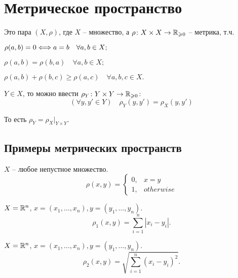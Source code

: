 \date{4 декабря 2024}

\section{Метрическое пространство}
\begin{definition}
    Это пара $(X, \rho)$, где $X$ -- множество, а $\rho\colon X\times X\to \mathbb R_{\geqslant 0}$ -- метрика, т.ч. \begin{conditions}
        \item $\rho(a,b) = 0 \Longleftrightarrow a = b \quad \forall a,b \in X;$ 
        \item $\rho(a,b) = \rho(b,a) \quad \forall a,b \in X;$
        \item $\rho(a, b) + \rho(b,c) \geqslant \rho(a,c) \quad \forall a,b,c \in X.$\footnotemark
    \end{conditions}
\end{definition}
\begin{definition}
    $Y \in X$, то можно ввести $\rho_Y\colon Y\times Y \to \mathbb R_{\geqslant0}$: \[
    (\forall y, y' \in Y)\quad \rho_Y(y, y') = \rho_X(y, y')
    \]

    То есть $\rho_Y = \rho_X|_{Y\times Y}$.
\end{definition}
\subsection*{Примеры метрических пространств}
\begin{example}
    $X$ -- любое непустное множество. \begin{equation}
        \rho(x,y) = \begin{cases}
            0, & x=y \\
            1, &otherwise
        \end{cases}
    \end{equation}
\end{example}
\begin{example}
    $X = \mathbb R^n$, $x = (x_1, \ldots, x_n), y =(y_1, \ldots, y_n)$. \begin{equation}
        \rho_1(x,y) = \sum_{i=1}^n |x_i-y_i|.
    \end{equation}
\end{example}
\begin{example}
    $X = \mathbb R^n$, $x = (x_1, \ldots, x_n), y =(y_1, \ldots, y_n)$. \begin{equation}
        \rho_2(x,y) = \sqrt{\sum_{i=1}^n (x_i-y_i)^2}.
    \end{equation}
\end{example}

